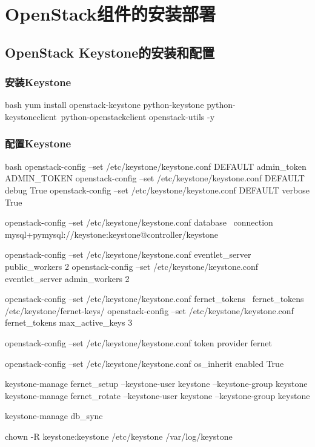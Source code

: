 \chapter{OpenStack组件的安装部署}
\section{OpenStack Keystone的安装和配置}

\subsection{安装Keystone}

\begin{code-block}{bash}
yum install openstack-keystone python-keystone python-keystoneclient\
    python-openstackclient openstack-utils -y
\end{code-block}


\subsection{配置Keystone}

\begin{code-block}{bash}
openstack-config --set /etc/keystone/keystone.conf DEFAULT admin_token ADMIN_TOKEN
openstack-config --set /etc/keystone/keystone.conf DEFAULT debug True
openstack-config --set /etc/keystone/keystone.conf DEFAULT verbose True

openstack-config --set /etc/keystone/keystone.conf database \
    connection mysql+pymysql://keystone:keystone@controller/keystone
    
openstack-config --set /etc/keystone/keystone.conf eventlet_server public_workers 2
openstack-config --set /etc/keystone/keystone.conf eventlet_server admin_workers 2

openstack-config --set /etc/keystone/keystone.conf fernet_tokens \
    fernet_tokens /etc/keystone/fernet-keys/
openstack-config --set /etc/keystone/keystone.conf fernet_tokens max_active_keys 3

openstack-config --set /etc/keystone/keystone.conf token provider fernet

openstack-config --set /etc/keystone/keystone.conf os_inherit enabled True

keystone-manage fernet_setup --keystone-user keystone --keystone-group keystone
keystone-manage fernet_rotate --keystone-user keystone --keystone-group keystone

keystone-manage db_sync

chown -R keystone:keystone /etc/keystone /var/log/keystone
\end{code-block}

